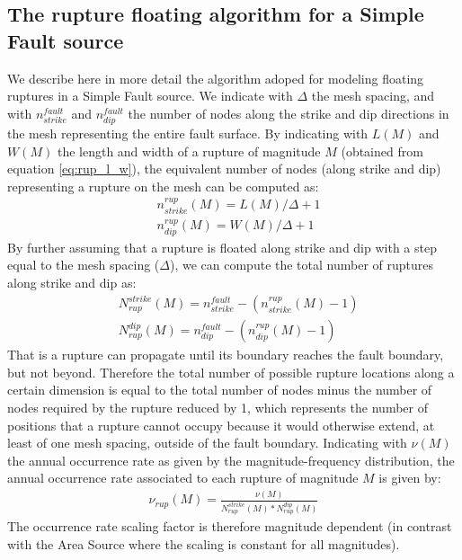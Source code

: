 \subsection{The rupture floating algorithm for a Simple Fault source}
We describe here in more detail the algorithm adoped for modeling floating ruptures in a Simple Fault source. We indicate with $\Delta$ the mesh spacing, and with $n_{strike}^{fault}$ and $n_{dip}^{fault}$ the number of nodes along the strike and dip directions in the mesh representing the entire fault surface. By indicating with $L(M)$ and $W(M)$ the length and width of a rupture of magnitude $M$ (obtained from equation \ref{eq:rup_l_w}), the equivalent number of nodes (along strike and dip) representing a rupture on the mesh can be computed as:
\begin{equation} \label{eq:rup_nodes}
\begin{split}
& n_{strike}^{rup}(M) =  L(M) / \Delta + 1 \\
& n_{dip}^{rup}(M)     = W(M) / \Delta + 1 
\end{split}
\end{equation}
By further assuming that a rupture is floated along strike and dip with a step equal to the mesh spacing ($\Delta$), we can compute the total number of ruptures along strike and dip as:
\begin{equation}
\begin{split}
& N_{rup}^{strike}(M) = n_{strike}^{fault} - (n_{strike}^{rup}(M) - 1) \\
& N_{rup}^{dip}(M)     = n_{dip}^{fault} - (n_{dip}^{rup}(M) - 1)
\end{split}
\end{equation}
That is a rupture can propagate until its boundary reaches the fault boundary, but not beyond. Therefore the total number of possible rupture locations along a certain dimension is equal to the total number of nodes minus the number of nodes required by the rupture reduced by 1, which represents the number of positions that a rupture
cannot occupy because it would otherwise extend, at least of one mesh spacing, outside of the fault boundary.
Indicating with $\nu(M)$ the annual occurrence rate as given by the magnitude-frequency distribution, the annual occurrence rate associated to each rupture of magnitude $M$ is given by:
\begin{align}
\nu_{rup}(M) = \frac{\nu(M)}{N_{rup}^{strike}(M) * N_{rup}^{dip}(M)}
\end{align}
The occurrence rate scaling factor is therefore magnitude dependent (in contrast with the Area Source where the scaling is constant for all magnitudes).


